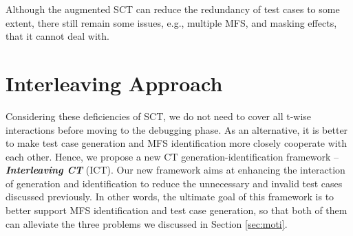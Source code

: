 \documentclass[journal,12pt,onecolumn,draftclsnofoot,]{IEEEtran}
\begin{document}
Although the augmented SCT can reduce the redundancy of test cases to some extent, there still remain some issues, e.g., multiple MFS, and masking effects, that it cannot deal with.


\section{Interleaving Approach}\label{sec:app}

Considering these deficiencies of SCT, we do not need to cover all t-wise interactions before moving to the debugging phase. As an alternative, it is better to make test case generation and MFS identification more closely cooperate with each other. Hence, we propose a new CT generation-identification framework -- \emph{\textbf{Interleaving CT}} (ICT). Our new framework aims at enhancing the interaction of generation and identification to reduce the unnecessary and invalid test cases discussed previously. In other words, the ultimate goal of this framework is to better support MFS identification and test case generation, so that both of them can alleviate the three problems we discussed in Section \ref{sec:moti}.
\end{document}
